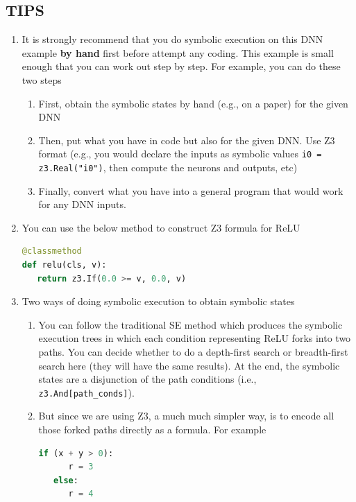 \subsection{TIPS}

\begin{enumerate}[label=\arabic*.]
\item It is strongly recommend that you do symbolic execution on this DNN example \textbf{by hand} first before attempt any coding.  This example is small enough that you can work out step by step.  For example, you can do these two steps
    \begin{enumerate}[label=(\alph*)]
    \item First, obtain the symbolic states by hand (e.g., on a paper) for the given DNN
    \item Then, put what you have in code but also for the given DNN. Use Z3 format (e.g.,  you would declare the inputs as symbolic values \texttt{i0 = z3.Real("i0")}, then compute the neurons and outputs, etc)
    \item Finally, convert what you have into a general program that would work for any DNN inputs.
    \end{enumerate}

\item You can use the below method to construct Z3 formula for ReLU

\begin{lstlisting}[language=Python]
@classmethod
def relu(cls, v):
   return z3.If(0.0 >= v, 0.0, v)
\end{lstlisting}

\item Two ways of doing symbolic execution to obtain symbolic states
    \begin{enumerate}[label=(\alph*)]
    \item You can follow the traditional SE method which produces the symbolic execution trees in which each condition representing ReLU forks into two paths.  You can decide whether to do a depth-first search or breadth-first search here (they will have the same results). At the end, the symbolic states are a disjunction of the path conditions (i.e., \texttt{z3.And[path\_conds]}).
    \item But since we are using Z3, a much much simpler way, is to encode all those forked paths directly as a formula.  For example

\begin{lstlisting}[language=Python]
   if (x + y > 0):
      r = 3
   else:
      r = 4
\end{lstlisting}


\end{enumerate}
\end{enumerate}
